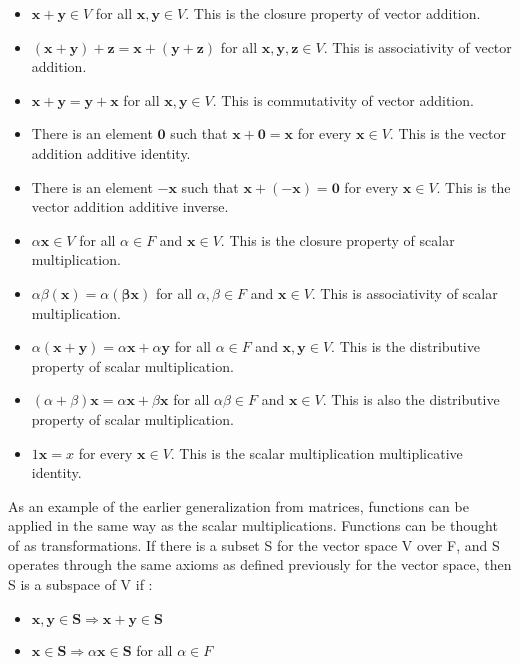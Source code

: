 \documentclass[12pt]{article}
\begin{document}
\begin{itemize}
    \item $\mathbf{x+y}\in V$ for all $\mathbf{x, y}\in V$. This is the closure property of vector addition.
    \item $(\mathbf{x+y})+\mathbf{z}=\mathbf{x}+(\mathbf{y+z})$ for all $\mathbf{x, y, z}\in V$. This is associativity of vector addition.
    \item $\mathbf{x+y}=\mathbf{y+x}$ for all $\mathbf{x, y}\in V$. This is commutativity of vector addition. 
    \item There is an element $\mathbf{0}$ such that $\mathbf{x+0=x}$ for every $\mathbf{x}\in V$. This is the vector addition additive identity.
    \item There is an element $\mathbf{-x}$ such that $\mathbf{x+(-x)=0}$ for every $\mathbf{x}\in V$. This is the vector addition additive inverse. 
    \item $\alpha\mathbf{x}\in V$ for all $\alpha\in F$ and $\mathbf{x}\in V$. This is the closure property of scalar multiplication.
    \item $\alpha\beta\mathbf{(x)}=\alpha\mathbf{(\beta x)}$ for all $\alpha, \beta\in F$ and $\mathbf{x}\in V$. This is associativity of scalar multiplication.
    \item $\alpha\mathbf{(x+y)}=\alpha\mathbf{x}+\alpha\mathbf{y}$ for all $\alpha\in F$ and $\mathbf{x, y}\in V$. This is the distributive property of scalar multiplication.
    \item $(\alpha+\beta)\mathbf{x}=\alpha\mathbf{x}+\beta\mathbf{x}$ for all $\alpha\beta\in F$ and $\mathbf{x}\in V$. This is also the distributive property of scalar 
    multiplication.
    \item $1\mathbf{x}=x$ for every $\mathbf{x}\in V$. This is the scalar multiplication multiplicative identity. 
\end{itemize}
As an example of the earlier generalization from matrices, functions can be applied in the same way as the scalar multiplications. Functions can be thought of as 
transformations. 
\newline
\newline
If there is a subset S for the vector space V over F, and S operates through the same axioms as defined previously for the vector space, then S is a subspace of V if :
\begin{itemize}
    \item $\mathbf{x,y\in S} \Rightarrow \mathbf{x+y\in S}$
    \item $\mathbf{x\in S} \Rightarrow \alpha\mathbf{x\in S}$ for all $\alpha\in F$
\end{itemize}
\end{document}
